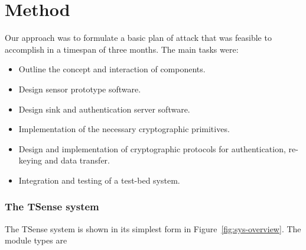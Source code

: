 \chapter{Method}

Our approach was to formulate a basic plan of attack that was feasible to accomplish in a timespan of three months.
%
The main tasks were:
\begin{itemize}
\item Outline the concept and interaction of components.
\item Design sensor prototype software.
\item Design sink and authentication server software.
\item Implementation of the necessary cryptographic primitives.
\item Design and implementation of cryptographic protocols for authentication, re-keying and data transfer.
\item Integration and testing of a test-bed system.
\end{itemize}


\subsection{The TSense system}

The TSense system is shown in its simplest form in Figure~\ref{fig:sys-overview}. The module types are


